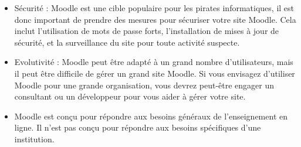 \begin{enumerate}
\begin{itemize}
            \item Sécurité : Moodle est une cible populaire pour les pirates informatiques, il est donc important de prendre des mesures pour sécuriser votre site Moodle. Cela inclut l'utilisation de mots de passe forts, l'installation de mises à jour de sécurité, et la surveillance du site pour toute activité suspecte.
            \item Evolutivité : Moodle peut être adapté à un grand nombre d'utilisateurs, mais il peut être difficile de gérer un grand site Moodle. Si vous envisagez d'utiliser Moodle pour une grande organisation, vous devrez peut-être engager un consultant ou un développeur pour vous aider à gérer votre site.
            \item Moodle est conçu pour répondre aux besoins généraux de l'enseignement en ligne. Il n'est pas conçu pour répondre aux besoins spécifiques d'une institution.
        \end{itemize}
\end{enumerate}
